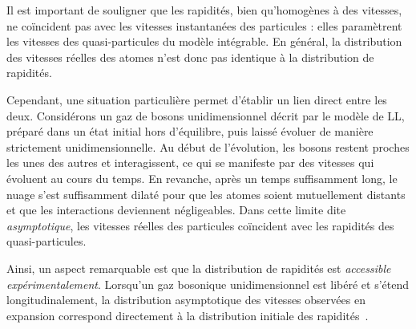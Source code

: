 {%


\smallskip

Il est important de souligner que les rapidités, bien qu’homogènes à des vitesses, ne coïncident pas avec les vitesses instantanées des particules : elles paramètrent les vitesses des quasi-particules du modèle intégrable. En général, la distribution des vitesses réelles des atomes n’est donc pas identique à la distribution de rapidités.

\smallskip

Cependant, une situation particulière permet d’établir un lien direct entre les deux. Considérons un gaz de bosons unidimensionnel décrit par le modèle de \gls{LL}, préparé dans un état initial hors d’équilibre, puis laissé évoluer de manière strictement unidimensionnelle. Au début de l’évolution, les bosons restent proches les unes des autres et interagissent, ce qui se manifeste par des vitesses qui évoluent au cours du temps. En revanche, après un temps suffisamment long, le nuage s’est suffisamment dilaté pour que les atomes soient mutuellement distants et que les interactions deviennent négligeables. Dans cette limite dite {\em asymptotique}, les vitesses réelles des particules coïncident avec les rapidités des quasi-particules.

\smallskip

Ainsi, un aspect remarquable est que la distribution de rapidités est {\em accessible expérimentalement}. Lorsqu’un gaz bosonique unidimensionnel est libéré et s’étend longitudinalement, la distribution asymptotique des vitesses observées en expansion correspond directement à la distribution initiale des rapidités~\cite{Nardis_2017,bezzaz2023rapiditydistributiondefocusingnonlinear}.

}

